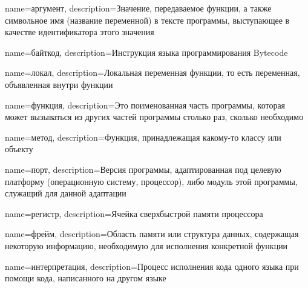  {
    name=аргумент,
    description={Значение, передаваемое функции, а также символьное имя (название переменной) в тексте программы, выступающее в качестве идентификатора этого значения}
}

 {
    name=байткод,
    description={Инструкция языка программирования Bytecode}
}

 {
    name=локал,
    description={Локальная переменная функции, то есть переменная, объявленная внутри функции}
}

 {
    name=функция,
    description={Это поименованная часть программы, которая может вызываться из других частей программы столько раз, сколько необходимо}
}

 {
    name=метод,
    description={Функция, принадлежащая какому-то классу или объекту}
}

 {
    name=порт,
    description={Версия программы, адаптированная под целевую платформу (операционную систему, процессор), либо модуль этой программы, служащий для данной адаптации}
}

 {
    name=регистр,
    description={Ячейка сверхбыстрой памяти процессора}
}

 {
    name=фрейм,
    description={Область памяти или структура данных, содержащая некоторую информацию, необходимую для исполнения конкретной функции}
}

 {
    name=интерпретация,
    description={Процесс исполнения кода одного языка при помощи кода, написанного на другом языке}
}



